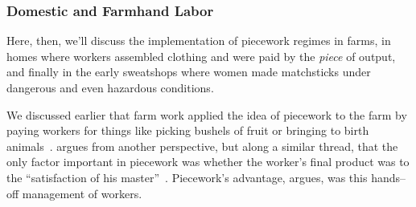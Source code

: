 \documentclass[trackingWork]{subfiles}
\begin{document}



\subsubsection{Domestic and Farmhand Labor}

\begin{comment}
What did I pull from the threads that are related to domestic/farmwork?

- Graves: sparks of Scientific Management in Piecework, especially starting here
- 19th century: piecework was mostly cottage industry with untrained or informally trained workers
  (unlike industrial metal workers during WWII)
- Brown: Task variability matters
- Clark: pieceworkers work harder, more diligently, etc...
- Riis saw terrible conditions, documented and communicated it to the world

\citeauthor{clark1908cotton} observed textile mill pieceworkers and reported,
``When he works by the day the Italian operative wishes to leave before the whistle blows,
but if he works by the piece he will work as many hours as it is possible for him to stand''~\cite{clark1908cotton}.


\end{comment}

Here, then, we'll discuss the implementation of piecework regimes in farms,
in homes where workers assembled clothing and were paid by the \textit{piece} of output, and
finally in the early sweatshops where women made matchsticks under dangerous and even hazardous conditions.

We discussed earlier that farm work applied the idea of piecework to the farm by
paying workers for things like picking bushels of fruit or bringing to birth animals~\cite{10.2307/2338394}.
\citeauthor{hughRaynbirdTaskWork} argues from another perspective, but along a similar thread, that
the only factor important in piecework was
whether the worker's final product was to the ``satisfaction of his master''~\cite{hughRaynbirdTaskWork}.
Piecework's advantage,
\citeauthor{hughRaynbirdTaskWork} argues,
was this hands--off management of workers.
\end{document}
